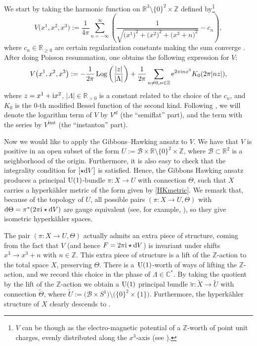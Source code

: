 We start by taking the harmonic function on $\mathbb{R}^3\setminus \{0\}^{2}\times \mathbb{Z}$ defined by\footnote{$V$ can be though as the electro-magnetic potential of a $\mathbb{Z}$-worth of point unit charges, evenly distributed along the $x^3$-axis (see \cite{OV}).}
\begin{equation*}
 V\bigl(x^1,x^2,x^3\bigr):=\frac{1}{4\pi}\sum_{n=-\infty}^{\infty}\left(\frac{1}{\sqrt{\bigl(x^1\bigr)^2+\bigl(x^2\bigr)^2+\bigl(x^3+n\bigr)^2}} -c_n\right),
\end{equation*}
where $c_n \in \mathbb{R}_{\geq 0}$ are certain regularization constants making the sum converge \cite{OV}. After doing Poisson resummation, one obtains the following expression for $V$:
\begin{equation*}
 V\bigl(x^1,x^2,x^3\bigr):=-\frac{1}{2\pi}\operatorname{Log}\left(\frac{|z|}{|\Lambda|}\right)+\frac{1}{2\pi}\sum_{n\neq 0, n\in \mathbb{Z}} {\rm e}^{2\pi {\rm i}n x^3}K_0(2\pi|nz|),
\end{equation*}
where $z=x^1+{\rm i}x^2$, $|\Lambda| \in \mathbb{R}_{>0}$ is a constant related to the choice of the $c_n$, and $K_0$ is the $0$-th modified Bessel function of the second kind. Following \cite{GMN1}, we will denote the logarithm term of $V$ by $V^{\text{sf}}$ (the ``semiflat'' part), and the term with the series by $V^{\text{inst}}$ (the ``instanton'' part).


Now we would like to apply the Gibbons--Hawking ansatz to $V$. We have that $V$ is positive in an open subset of the form $U:=\mathcal{B}\times \mathbb{R}\setminus \{0\}^2\times \mathbb{Z}$, where $\mathcal{B}\subset \mathbb{R}^2$ is a neighborhood of the origin. Furthermore, it is also easy to check that the integrality condition for $[\star {\rm d}V]$ is satisfied. Hence, the Gibbons Hawking ansatz produces a principal ${\rm U}(1)$-bundle $\pi\colon X\to U$ with connection $\Theta$, such that $X$ carries a hyperk\"ahler metric of the form given by \eqref{HKmetric}. We remark that, because of the topology of $U$, all possible pairs $(\pi\colon X\to U,\Theta)$ with ${\rm d}\Theta=\pi^*(2\pi {\rm i} \star {\rm d}V)$ are gauge equivalent (see, for example, \cite[Theorem 2.5.1]{Kostant}), so they give isometric hyperk\"ahler spaces.

The pair $(\pi\colon X\to U, \Theta)$ actually admits an extra piece of structure, coming from the fact that $V$ (and hence $F=2\pi {\rm i} \star {\rm d}V$) is invariant under shifts $x^3\to x^3+n$ with $n\in \mathbb{Z}$. This extra piece of structure is a lift of the $\mathbb{Z}$-action to the total space $X$, preserving $\Theta$. There is a~${\rm U}(1)$-worth of ways of lifting the $\mathbb{Z}$-action, and we record this choice in the phase of $\Lambda \in \mathbb{C}^*$. By taking the quotient by the lift of the $\mathbb{Z}$-action we obtain a ${\rm U}(1)$ principal bundle $\widetilde{\pi}\colon\widetilde{X}\to \widetilde{U}$ with connection $\widetilde{\Theta}$, where $\widetilde{U}:=\bigl(\mathcal{B}\times S^1\bigr)\setminus \bigl(\{0\}^2\times \{1\}\bigr)$. Furthermore, the hyperk\"ahler structure of $X$ clearly descends to .

